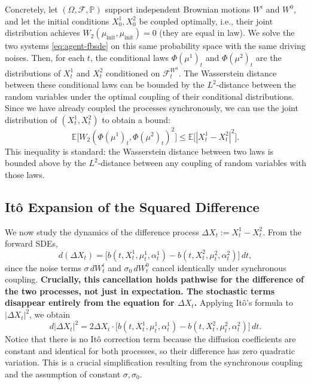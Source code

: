 Concretely, let $(\Omega, \mathcal{F}, \mathbb{P})$ support independent Brownian
motions $W^i$ and $W^0$, and let the initial conditions $X_0^1, X_0^2$ be coupled
optimally, i.e., their joint distribution achieves
$W_2(\mu_{\mathrm{init}}, \mu_{\mathrm{init}}) = 0$ (they are equal in law). We solve
the two systems \eqref{eq:agent-fbsde} on this same probability space with the same
driving noises. Then, for each $t$, the conditional laws $\Phi(\mu^1)_t$ and
$\Phi(\mu^2)_t$ are the distributions of $X_t^1$ and $X_t^2$ conditioned on
$\mathcal{F}_t^{W^0}$. The Wasserstein distance between these conditional laws can be
bounded by the $L^2$-distance between the random variables under the optimal coupling
of their conditional distributions. Since we have already coupled the processes
synchronously, we can use the joint distribution of $(X_t^1, X_t^2)$ to obtain a bound:
\begin{equation}
    \mathbb{E}\big[W_2(\Phi(\mu^1)_t, \Phi(\mu^2)_t)^2\big] \leq
    \mathbb{E}\big[|X_t^1 - X_t^2|^2\big].
    \label{eq:wasserstein-l2-bound}
\end{equation}
This inequality is standard: the Wasserstein distance between two laws is bounded
above by the $L^2$-distance between any coupling of random variables with those laws.

\subsection{It\^o Expansion of the Squared Difference}

We now study the dynamics of the difference process $\Delta X_t := X_t^1 - X_t^2$. From
the forward SDEs,
\[
    d(\Delta X_t) = \big[b(t, X_t^1, \mu_t^1, \alpha_t^1) - b(t, X_t^2, \mu_t^2,
    \alpha_t^2)\big]\, dt,
\]
since the noise terms $\sigma\, dW_t^i$ and $\sigma_0\, dW_t^0$ cancel identically
under synchronous coupling. \textbf{Crucially, this cancellation holds pathwise for the
difference of the two processes, not just in expectation. The stochastic terms
disappear entirely from the equation for $\Delta X_t$.} Applying It\^o's formula to
$|\Delta X_t|^2$, we obtain
\begin{equation}
    d|\Delta X_t|^2 = 2\Delta X_t \cdot \big[b(t, X_t^1, \mu_t^1, \alpha_t^1) -
    b(t, X_t^2, \mu_t^2, \alpha_t^2)\big]\, dt.
    \label{eq:ito-expansion}
\end{equation}
Notice that there is no It\^o correction term because the diffusion coefficients are
constant and identical for both processes, so their difference has zero quadratic
variation. This is a crucial simplification resulting from the synchronous coupling and
the assumption of constant $\sigma, \sigma_0$.


